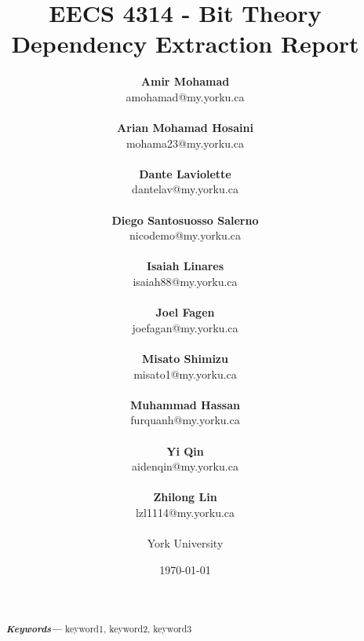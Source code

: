 \documentclass[12pt, dvipsnames, a4paper]{article}
\providecommand{\keywords}[1]
{
  \small	
  \textbf{\textit{Keywords---}} #1
}
\begin{document}
\title{\textbf{EECS 4314 - Bit Theory\\Dependency Extraction Report}}
\date{\Large \today}
\author{
	\large \textbf{Amir Mohamad}\\ \small amohamad@my.yorku.ca\\\\
	\large \textbf{Arian Mohamad Hosaini}\\ \small mohama23@my.yorku.ca\\\\
	\large \textbf{Dante Laviolette}\\ \small dantelav@my.yorku.ca\\\\
	\large \textbf{Diego Santosuosso Salerno}\\ \small nicodemo@my.yorku.ca\\\\
	\large \textbf{Isaiah Linares}\\ \small isaiah88@my.yorku.ca\\\\
	\large \textbf{Joel Fagen}\\ \small joefagan@my.yorku.ca\\\\
	\large \textbf{Misato Shimizu}\\ \small misato1@my.yorku.ca\\\\
	\large \textbf{Muhammad Hassan}\\ \small furquanh@my.yorku.ca\\\\
	\large \textbf{Yi Qin}\\ \small aidenqin@my.yorku.ca\\\\
	\large \textbf{Zhilong Lin}\\ \small lzl1114@my.yorku.ca\\\\
	\large York University\\
}
\maketitle
\newpage
\hspace{0pt}
\vfill
\begin{abstract}
	\lipsum[1]
	\lipsum[1]
	\\\\
	\keywords{keyword1, keyword2, keyword3}
\end{abstract}
\vfill
\hspace{0pt}
\newpage
\tableofcontents
\clearpage
\end{document}
